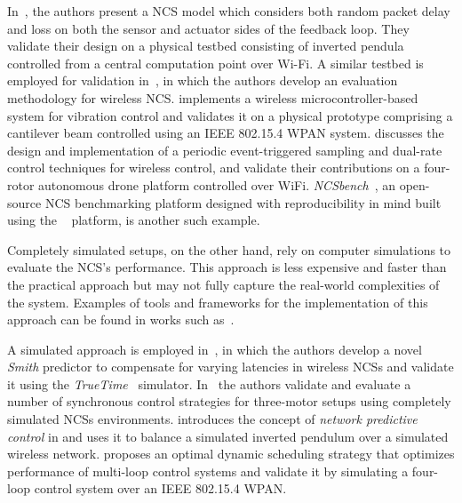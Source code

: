 In~\cite{drew2005networked}, the authors present a \gls{NCS} model which considers both random packet delay and loss on both the sensor and actuator sides of the feedback loop.
They validate their design on a physical testbed consisting of inverted pendula controlled from a central computation point over Wi-Fi.
A similar testbed is employed for validation in~\cite{baumann2018evaluating}, in which the authors develop an evaluation methodology for wireless \gls{NCS}.\@
\cite{li2014wireless} implements a wireless microcontroller-based system for vibration control and validates it on a physical prototype comprising a cantilever beam controlled using an \acs{IEEE} 802.15.4 \gls{WPAN} system.\@ \cite{cuenca2019periodic} discusses the design and implementation of a periodic event-triggered sampling and dual-rate control techniques for wireless control, and validate their contributions on a four-rotor autonomous drone platform controlled over WiFi.
\emph{NCSbench}~\cite{zoppi2020ncsbench}, an open-source \gls{NCS} benchmarking platform designed with reproducibility in mind built using the ~\cite{LEGOMindstormsEV3} platform, is another such example.

Completely simulated setups, on the other hand, rely on computer simulations to evaluate the \gls{NCS}'s performance.
This approach is less expensive and faster than the practical approach but may not fully capture the real-world complexities of the system.
Examples of tools and frameworks for the implementation of this approach can be found in works such as~\cite{andersson2005simulation,eyisi2012ncswt}.

A simulated approach is employed in~\cite{du2009novel}, in which the authors develop a novel \emph{Smith} predictor to compensate for varying latencies in wireless \glspl{NCS} and validate it using the \emph{TrueTime}~\cite{henriksson2002truetime} simulator.
In~\cite{chen2015synchronous} the authors validate and evaluate a number of synchronous control strategies for three-motor setups using completely simulated \glspl{NCS} environments.\@
\cite{wu2012application} introduces the concept of \emph{network predictive control} in and uses it to balance a simulated inverted pendulum over a simulated wireless network.\@
\cite{ma2019optimal} proposes an optimal dynamic scheduling strategy that optimizes performance of multi-loop control systems and validate it by simulating a four-loop control system over an \acs{IEEE} 802.15.4 \gls{WPAN}.

